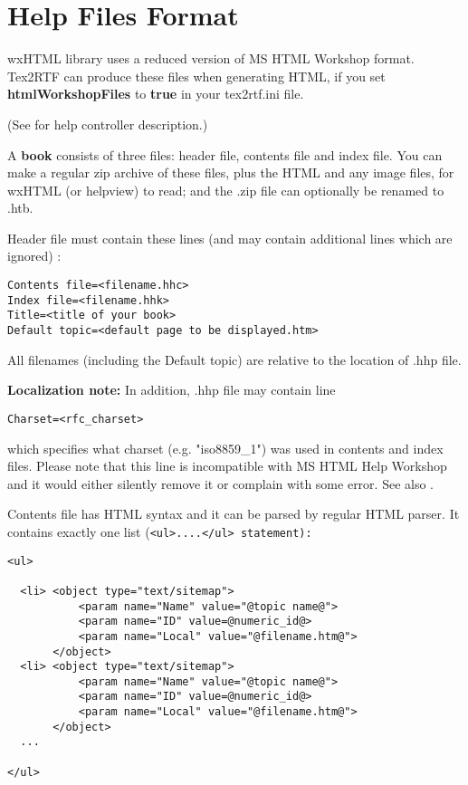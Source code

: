 \section{Help Files Format}\label{helpformat}

wxHTML library uses a reduced version of MS HTML Workshop format.
Tex2RTF can produce these files when generating HTML, if you set {\bf htmlWorkshopFiles} to {\bf true} in
your tex2rtf.ini file.

(See  for help controller description.)

A {\bf book} consists of three files: header file, contents file and index file.
You can make a regular zip archive of these files, plus the HTML and any image files,
for wxHTML (or helpview) to read; and the .zip file can optionally be renamed to .htb.


Header file must contain these lines (and may contain additional lines which are ignored) :

\begin{verbatim}
Contents file=<filename.hhc>
Index file=<filename.hhk>
Title=<title of your book>
Default topic=<default page to be displayed.htm>
\end{verbatim}

All filenames (including the Default topic) are relative to the 
location of .hhp file.

{\bf Localization note:} In addition, .hhp file may contain line

\begin{verbatim}
Charset=<rfc_charset>
\end{verbatim}

which specifies what charset (e.g. "iso8859\_1") was used in contents
and index files. Please note that this line is incompatible with
MS HTML Help Workshop and it would either silently remove it or complain
with some error. See also 
.


Contents file has HTML syntax and it can be parsed by regular HTML parser. It contains exactly one list
(\tt{<ul>}....\tt{</ul>} statement):

\begin{verbatim}
<ul>

  <li> <object type="text/sitemap">
           <param name="Name" value="@topic name@">
           <param name="ID" value=@numeric_id@>
           <param name="Local" value="@filename.htm@">
       </object>
  <li> <object type="text/sitemap">
           <param name="Name" value="@topic name@">
           <param name="ID" value=@numeric_id@>
           <param name="Local" value="@filename.htm@">
       </object>
  ...    

</ul>
\end{verbatim}

